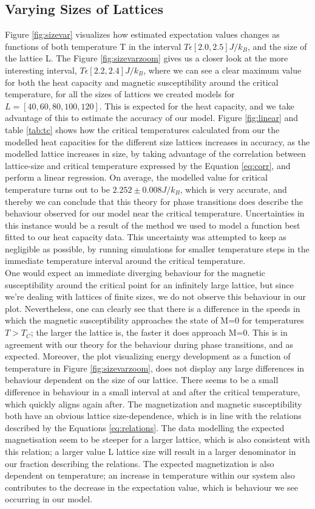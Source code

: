 \documentclass[10pt, nofootinbib, twocolumn]{revtex4-1}
\begin{document}
\subsection{Varying Sizes of Lattices}
Figure \ref{fig:sizevar} visualizes how estimated expectation values changes as functions of both temperature T in the interval $T\epsilon [2.0,2.5]J/k_B$, and the size of the lattice L. The Figure \ref{fig:sizevarzoom} gives us a closer look at the more interesting interval, $T\epsilon [2.2,2.4]J/k_B$, where we can see a clear maximum value for both the heat capacity and magnetic susceptibility around the critical temperature, for all the sizes of lattices we created models for $L=[40,60,80,100,120]$. This is expected for the heat capacity, and we take advantage of this to estimate the accuracy of our model. Figure \ref{fig:linear} and table \ref{tab:tc} shows how the critical temperatures calculated from our the modelled heat capacities for the different size lattices increases in accuracy, as the modelled lattice increases in size, by taking advantage of the correlation between lattice-size and critical temperature expressed by the Equation \eqref{eq:corr}, and perform a linear regression. On average, the modelled value for critical temperature turns out to be $2.252 \pm 0.008 J/k_B$, which is very accurate, and thereby we can conclude that this theory for phase transitions does describe the behaviour observed for our model near the critical temperature. Uncertainties in this instance would be a result of the method we used to model a function best fitted to our heat capacity data. This uncertainty was attempted to keep as negligible as possible, by running simulations for smaller temperature steps in the immediate temperature interval around the critical temperature.\\
One would expect an immediate diverging behaviour for the magnetic susceptibility around the critical point for an infinitely large lattice, but since we're dealing with lattices of finite sizes, we do not observe this behaviour in our plot. Nevertheless, one can clearly see that there is a difference in the speeds in which the magnetic susceptibility approaches the state of M=0 for temperatures $T>T_C$; the larger the lattice is, the faster it does approach M=0. This is in agreement with our theory for the behaviour during phase transitions, and as expected. Moreover, the plot visualizing energy development as a function of temperature in Figure \ref{fig:sizevarzoom}, does not display any large differences in behaviour dependent on the size of our lattice. There seems to be a small difference in behaviour in a small interval at and after the critical temperature, which quickly aligns again after. The magnetization and magnetic susceptibility both have an obvious lattice size-dependence, which is in line with the relations described by the Equations \eqref{eq:relations}. The data modelling the expected magnetisation seem to be steeper for a larger lattice, which is also consistent with this relation; a larger value L lattice size will result in a larger denominator in our fraction describing the relations. The expected magnetization is also dependent on temperature; an increase in temperature within our system also contributes to the decrease in the expectation value, which is behaviour we see occurring in our model.
\end{document}
